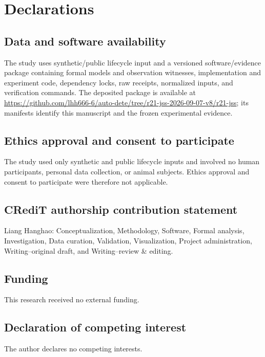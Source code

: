\section*{Declarations}

\subsection*{Data and software availability}

The study uses synthetic/public lifecycle input and a versioned software/evidence package containing formal models and observation witnesses, implementation and experiment code, dependency locks, raw receipts, normalized inputs, and verification commands. The deposited package is available at \url{https://github.com/lhh666-6/auto-dete/tree/r21-jss-2026-09-07-v8/r21-jss}; its manifests identify this manuscript and the frozen experimental evidence.

\subsection*{Ethics approval and consent to participate}

The study used only synthetic and public lifecycle inputs and involved no human participants, personal data collection, or animal subjects. Ethics approval and consent to participate were therefore not applicable.

\subsection*{CRediT authorship contribution statement}

Liang Hanghao: Conceptualization, Methodology, Software, Formal analysis, Investigation, Data curation, Validation, Visualization, Project administration, Writing--original draft, and Writing--review \& editing.

\subsection*{Funding}

This research received no external funding.

\subsection*{Declaration of competing interest}

The author declares no competing interests.

